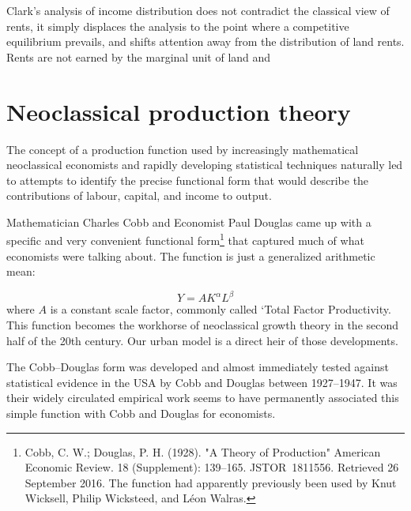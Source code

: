Clark's analysis of income distribution does not contradict the classical view of rents, it simply displaces the analysis to the point where a competitive equilibrium prevails, and shifts attention away from the distribution of land rents. Rents are not earned by the marginal unit of land and  

\section{Neoclassical production theory}
The concept of a production function used by increasingly mathematical neoclassical economists and  rapidly developing statistical techniques  naturally led to attempts to identify the precise functional form that would describe the contributions of labour, capital, and income to output.
 
Mathematician Charles Cobb and Economist Paul Douglas came up with a specific and very convenient functional form\footnote{Cobb, C. W.; Douglas, P. H. (1928). "A Theory of Production"  American Economic Review. 18 (Supplement): 139–165. JSTOR 1811556. Retrieved 26 September 2016. The function had apparently previously been used by Knut Wicksell, Philip Wicksteed, and L\'eon Walras.} that captured much of what economists were talking about. The function is just a generalized arithmetic mean:
 
 \[Y=AK^\alpha L^\beta\]
 where $A$ is a constant scale factor, commonly called `Total Factor Productivity. This function becomes the workhorse of neoclassical growth theory in the second half  of the 20th century. Our urban model is a direct heir of those developments.



The Cobb–Douglas form was developed and almost immediately tested against statistical evidence in the USA by Cobb and Douglas between 1927–1947. It was  their widely circulated empirical work seems to have permanently associated this simple function with Cobb and Douglas for economists.

